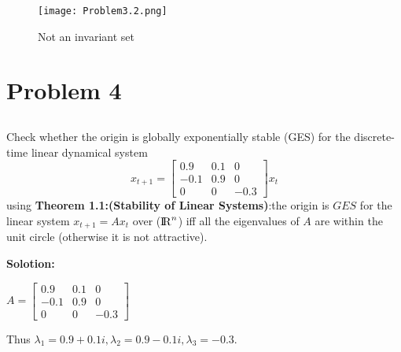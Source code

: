 \documentclass[a4paper,11pt,reqno]{amsart}
\newcommand{\R}{{\rm I\!R}}
\begin{document}
\begin{figure}[H]
    \centering
    \texttt{[image: Problem3.2.png]}
    \caption{Not an invariant set}
    \label{f3}
    \end{figure}


\section{Problem 4}
\subsection{}
Check whether the origin is globally exponentially stable (GES) for the discrete-time linear
dynamical system
\begin{equation}
    x_{t+1} = \begin{bmatrix} 0.9 & 0.1 & 0 \\ -0.1 & 0.9 & 0 \\ 0 & 0 & -0.3\end{bmatrix} x_t
    \label{8}
\end{equation}
using \textbf{Theorem 1.1:(Stability of Linear Systems)}:the origin is $GES$ for the linear system
$x_{t+1} = Ax_t$ over ($\R^n$) iff all the eigenvalues of $A$ are within the unit circle
(otherwise it is not attractive).

\textbf{Solotion:}

$A = \begin{bmatrix} 0.9 & 0.1 & 0 \\ -0.1 & 0.9 & 0 \\ 0 & 0 & -0.3\end{bmatrix}$

Thus $\lambda_1=0.9+0.1i,\lambda_2=0.9-0.1i,\lambda_3=-0.3$.
\end{document}

